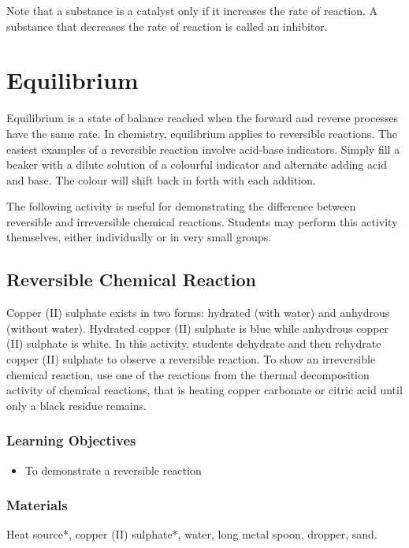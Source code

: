 Note that a substance is a catalyst only if it increases the rate of reaction. A substance that decreases the rate of reaction is called an inhibitor.

\section{Equilibrium}

Equilibrium is a state of balance reached when the forward and reverse processes have the same rate. In chemistry, equilibrium applies to reversible reactions. The easiest examples of a reversible reaction involve acid-base indicators. Simply fill a beaker with a dilute solution of a colourful indicator and alternate adding acid and base. The colour will shift back in forth with each addition.

The following activity is useful for demonstrating the difference between reversible and irreversible chemical reactions. Students may perform this activity themselves, either individually or in very small groups.

\subsection{Reversible Chemical Reaction}

Copper (II) sulphate exists in two forms: hydrated (with water) and anhydrous (without water). Hydrated copper (II) sulphate is blue while anhydrous copper (II) sulphate is white. In this activity, students dehydrate and then rehydrate copper (II) sulphate to observe a reversible reaction. To show an irreversible chemical reaction, use one of the reactions from the thermal decomposition activity of chemical reactions, that is heating copper carbonate or citric acid until only a black residue remains.

\subsubsection*{Learning Objectives}
\begin{itemize}
\item{To demonstrate a reversible reaction}
\end{itemize}

\subsubsection*{Materials}
Heat source*, copper (II) sulphate*, water, long metal spoon, dropper, sand.


